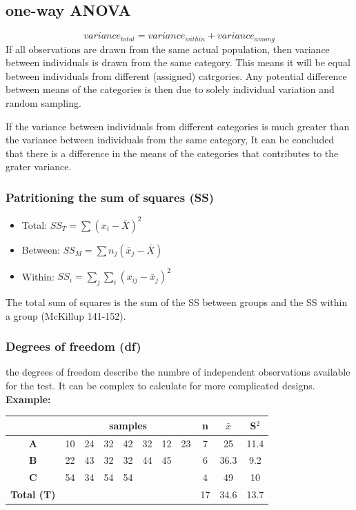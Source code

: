 \documentclass{article}
\begin{document}
\subsection{one-way ANOVA}
\begin{equation*}
    variance_{total} = variance_{within} + variance_{among}
\end{equation*}
If all observations are drawn from the same actual population, then variance between individuals is drawn from the same category. This means it will be equal between individuals from different (assigned) catrgories. Any potential difference between means of the categories is then due to solely individual variation and random sampling.\par 
If the variance between individuals from different categories is much greater than the variance between individuals from the same category, It can be concluded that there is a difference in the means of the categories that contributes to the grater variance.

\subsubsection{Patritioning the sum of squares (SS)}
\begin{itemize}
    \item Total: $SS_T = \sum (x_i - \bar{X})^2$
    \item Between: $SS_M = \sum n_j(\bar{x}_j - \bar{X})$
    \item Within: $SS_i = \sum_j \sum_i (x_{ij} - \bar{x}_j)^2$
\end{itemize}
The total sum of squares is the sum of the SS between groups and the SS within a group (McKillup 141-152).

\subsubsection{Degrees of freedom (df)}
the degrees of freedom describe the numbre of independent observations available for the test. It can be complex to calculate for more complicated designs. \\
\textbf{Example:}
\begin{table}[h]
    \centering
    \begin{tabular}{c|c|c|c|c|c|c|c|c|c|c}
        & \multicolumn{7}{|c|}{samples} & n & $\bar{x}$ & S$^2$\\
        \hline
        \textbf{A} &10 & 24 & 32 & 42 & 32 & 12 & 23 & 7 & 25 & 11.4\\
        \textbf{B} &22 & 43 & 32 & 32 & 44 & 45 &    & 6 & 36.3 & 9.2\\
        \textbf{C} &54 & 34 & 54 & 54 &    &    &    & 4 & 49 & 10 \\
        \hline
        \textbf{Total (T)} &\multicolumn{7}{|c|}{ }& 17 & 34.6 & 13.7\\
    \end{tabular}
\end{table}
\end{document}
